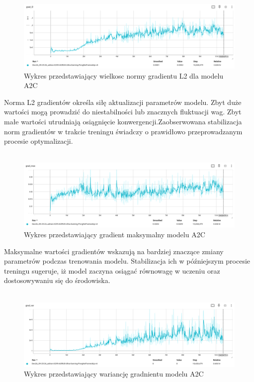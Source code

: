 \documentclass[a4paper, 12pt]{article}
\numberwithin{equation}{section}
\begin{document}
    \begin{figure}[H]
        \centering
        \includegraphics[width=\textwidth]{pictures/A2C_grad_l2.png}
        \caption{Wykres przedstawiający wielkosc normy gradientu L2 dla modelu A2C}
    \end{figure}
    Norma L2 gradientów określa siłę aktualizacji parametrów modelu. Zbyt duże wartości mogą prowadzić do niestabilności lub znacznych fluktuacji wag.  Zbyt małe wartości utrudniają osiągnięcie konwergencji.Zaobserwowana stabilizacja norm gradientów w trakcie treningu świadczy o prawidłowo przeprowadzanym procesie optymalizacji.
    \\ \\ 
    \begin{figure}[H]
        \centering
        \includegraphics[width=\textwidth]{pictures/A2C_grad_max.png}
        \caption{Wykres przedstawiający gradient maksymalny modelu A2C}
    \end{figure}
    Maksymalne wartości gradientów wskazują na bardziej znaczące zmiany parametrów podczas trenowania modelu. Stabilizacja ich w późniejszym procesie treningu sugeruje, iż model zaczyna osiągać równowagę w uczeniu oraz dostosowywaniu się do środowiska.
    \\ \\ 
    \begin{figure}[H]
        \centering
        \includegraphics[width=\textwidth]{pictures/A2C_grad_var.png}
        \caption{Wykres przedstawiający wariancję gradnientu modelu A2C}
    \end{figure}
\end{document}
